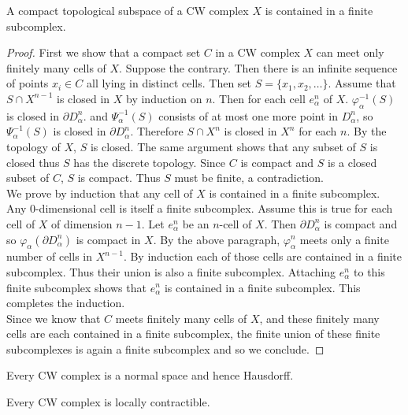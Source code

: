 \documentclass[a4paper]{article}
\begin{document}
\begin{prp}{}{} A compact topological subspace of a CW complex $X$ is contained in a finite subcomplex. 
\begin{proof}
First we show that a compact set $C$ in a CW complex $X$ can meet only finitely many cells of $X$. Suppose the contrary. Then there is an infinite sequence of points $x_i\in C$ all lying in distinct cells. Then set $S=\{x_1,x_2,\dots\}$. Assume that $S\cap X^{n-1}$ is closed in $X$ by induction on $n$. Then for each cell $e_\alpha^n$ of $X$. $\varphi_\alpha^{-1}(S)$ is closed in $\partial D_\alpha^n$. and $\Psi_\alpha^{-1}(S)$ consists of at most one more point in $D_\alpha^n$, so $\Psi_\alpha^{-1}(S)$ is closed in $\partial D_\alpha^n$. Therefore $S\cap X^n$ is closed in $X^n$ for each $n$. By the topology of $X$, $S$ is closed. The same argument shows that any subset of $S$ is closed thus $S$ has the discrete topology. Since $C$ is compact and $S$ is a closed subset of $C$, $S$ is compact. Thus $S$ must be finite, a contradiction. \\

We prove by induction that any cell of $X$ is contained in a finite subcomplex. Any $0$-dimensional cell is itself a finite subcomplex. Assume this is true for each cell of $X$ of dimension $n-1$. Let $e_\alpha^n$ be an $n$-cell of $X$. Then $\partial D_\alpha^n$ is compact and so $\varphi_\alpha(\partial D_\alpha^n)$ is compact in $X$. By the above paragraph, $\varphi_\alpha^n$ meets only a finite number of cells in $X^{n-1}$. By induction each of those cells are contained in a finite subcomplex. Thus their union is also a finite subcomplex. Attaching $e_\alpha^n$ to this finite subcomplex shows that $e_\alpha^n$ is contained in a finite subcomplex. This completes the induction. \\

Since we know that $C$ meets finitely many cells of $X$, and these finitely many cells are each contained in a finite subcomplex, the finite union of these finite subcomplexes is again a finite subcomplex and so we conclude. 
\end{proof}
\end{prp}

\begin{prp}{}{} Every CW complex is a normal space and hence Hausdorff. 
\end{prp}

\begin{prp}{}{} Every CW complex is locally contractible. 
\end{prp}
\end{document}
